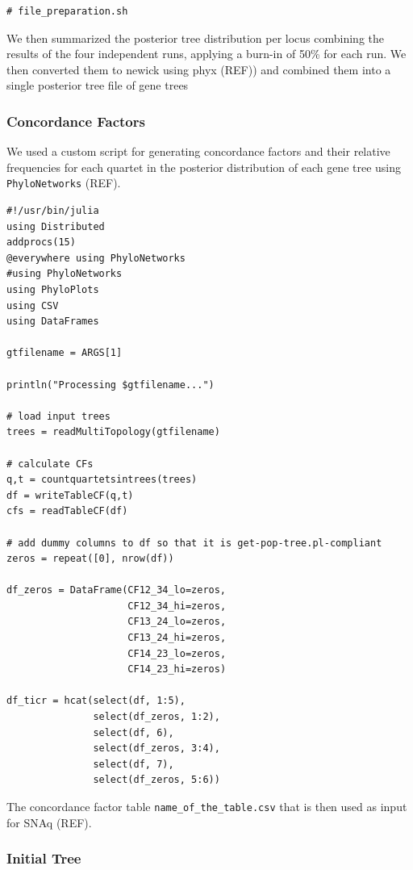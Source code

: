 \documentclass[utf8]{frontiers_suppmat} %
\begin{document}
\begin{verbatim}
# file_preparation.sh
\end{verbatim}

We then summarized the posterior tree distribution per locus combining the results of the four independent runs, applying a burn-in of 50\% for each run. We then converted them to newick using phyx (REF)) and combined them into a single posterior tree file of gene trees

\subsubsection{Concordance Factors}

We used a custom script for generating concordance factors and their relative frequencies for each quartet in the posterior distribution of each gene tree using \texttt{PhyloNetworks} (REF).

\begin{verbatim}
#!/usr/bin/julia
using Distributed
addprocs(15)
@everywhere using PhyloNetworks
#using PhyloNetworks
using PhyloPlots
using CSV
using DataFrames

gtfilename = ARGS[1]

println("Processing $gtfilename...")

# load input trees
trees = readMultiTopology(gtfilename)

# calculate CFs
q,t = countquartetsintrees(trees)
df = writeTableCF(q,t)
cfs = readTableCF(df)

# add dummy columns to df so that it is get-pop-tree.pl-compliant
zeros = repeat([0], nrow(df))

df_zeros = DataFrame(CF12_34_lo=zeros,
                     CF12_34_hi=zeros,
                     CF13_24_lo=zeros,
                     CF13_24_hi=zeros,
                     CF14_23_lo=zeros,
                     CF14_23_hi=zeros)

df_ticr = hcat(select(df, 1:5),
               select(df_zeros, 1:2),
               select(df, 6),
               select(df_zeros, 3:4),
               select(df, 7),
               select(df_zeros, 5:6))
\end{verbatim}

The concordance factor table \texttt{name\_of\_the\_table.csv} that is then used as input for SNAq (REF).

\subsubsection{Initial Tree}
\end{document}
